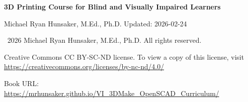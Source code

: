 \renewcommand{\maketitle}{}
\begin{titlepage}
    \centering
    \vspace*{2cm}
    {\Huge\bfseries 3D Printing Course for Blind and Visually Impaired Learners\par}
    \vspace{1.5cm}
    {\Large Michael Ryan Hunsaker, M.Ed., Ph.D.}
    \vfill
    {\large Updated: 2026-02-24}
\end{titlepage}

\newpage
\thispagestyle{empty}
\vspace*{\fill}
{\small \textcopyright\ 2026 Michael Ryan Hunsaker, M.Ed., Ph.D. All rights reserved.}
{\small Creative Commons CC BY-SC-ND license. To view a copy of this license, visit \url{https://creativecommons.org/licenses/by-nc-nd/4.0/}\par}
{\small Book URL: \url{https://mrhunsaker.github.io/VI_3DMake_OpenSCAD_Curriculum/}}
\newpage